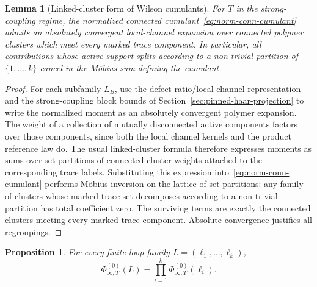 \documentclass[11pt,a4paper,reqno]{amsart}
\newtheorem{lemma}[theorem]{Lemma}
\newtheorem{proposition}[theorem]{Proposition}
\theoremstyle{definition}
\theoremstyle{remark}
\begin{document}
\begin{lemma}[Linked-cluster form of Wilson cumulants]\label{lem:wilson-cumulant-linked-cluster}
For $T$ in the strong-coupling regime, the normalized connected cumulant~\eqref{eq:norm-conn-cumulant} admits an absolutely convergent local-channel expansion over connected polymer clusters which meet every marked trace component. In particular, all contributions whose active support splits according to a non-trivial partition of $\{1,\ldots,k\}$ cancel in the M\"obius sum defining the cumulant.
\end{lemma}

\begin{proof}
For each subfamily $L_B$, use the defect-ratio/local-channel representation and the strong-coupling block bounds of Section~\ref{sec:pinned-haar-projection} to write the normalized moment as an absolutely convergent polymer expansion. The weight of a collection of mutually disconnected active components factors over those components, since both the local channel kernels and the product reference law do. The usual linked-cluster formula therefore expresses moments as sums over set partitions of connected cluster weights attached to the corresponding trace labels. Substituting this expression into~\eqref{eq:norm-conn-cumulant} performs M\"obius inversion on the lattice of set partitions: any family of clusters whose marked trace set decomposes according to a non-trivial partition has total coefficient zero. The surviving terms are exactly the connected clusters meeting every marked trace component. Absolute convergence justifies all regroupings.
\end{proof}

\begin{proposition}\label{prop:factorization}
For every finite loop family $L=(\ell_1,\ldots,\ell_k)$,
\begin{equation}\label{eq:factorization-phi}
\Phi^{(0)}_{\infty,T}(L)=\prod_{i=1}^k\Phi^{(0)}_{\infty,T}(\ell_i).
\end{equation}
\end{proposition}
\end{document}
